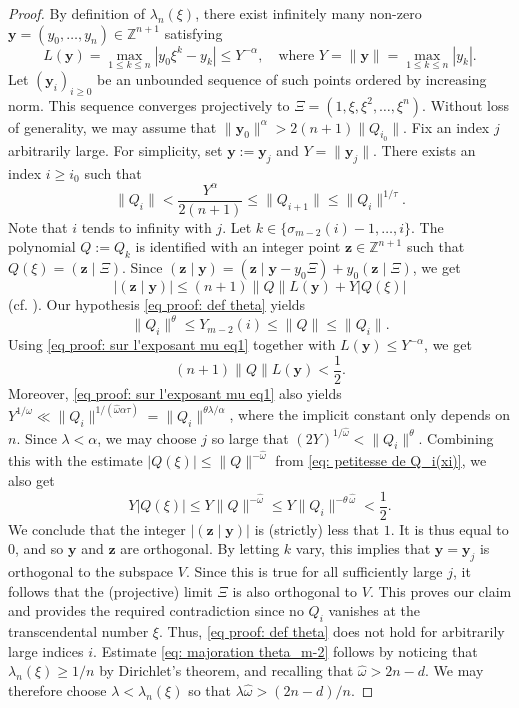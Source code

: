 \documentclass[JEP,XML,SOM,Unicode,NoFloatCountersInSection,published]{cedram}
\newcommand\by{\boldsymbol{y}}
\newcommand\bz{\boldsymbol{z}}
\newcommand\bZ{\mathbb{Z}}
\newcommand\homega{\widehat{\omega}}\newcommand\HH{\mathcal{H}}
\newcommand{\normH}[1]{\|#1\|}
\newcommand{\psc}[2]{\left(#1 \mid #2\right)}
\theoremstyle{definition}
\theoremstyle{plain}
\begin{document}
\begin{proof}
By definition of $\lambda_n(\xi)$, there exist infinitely many non-zero $\by=(y_0,\dots,y_n)\in\bZ^{n+1}$ satisfying
\begin{equation*}
L(\by) =\max_{1\le k \le n} |y_0\xi^k - y_k| \leq Y^{-\alpha},\quad \textrm{where } Y = \normH{\by} = \max_{1\leq k\leq n} |y_k|.
\end{equation*}
Let $(\by_i)_{i\geq 0}$ be an unbounded sequence of such points ordered by increasing norm. This sequence converges projectively to $\Xi = (1,\xi,\xi^2,\dots,\xi^n)$. Without loss of generality, we may assume that $\normH{\by_0}^{\alpha} > 2(n+1)\normH{Q_{i_0}}$. Fix an index $j$ arbitrarily large. For simplicity, set $\by:= \by_j$ and $Y = \normH{\by_j}$. There exists an index $i\geq i_0$ such that
\begin{equation}
\label{eq proof: sur l'exposant mu eq1}
\normH{Q_i} < \frac{Y^{\alpha}}{2(n+1)} \leq \normH{Q_{i+1}} \leq \normH{Q_i}^{1/\tau}.
\end{equation}
Note that $i$ tends to infinity with $j$. Let $k\in\{\sigma_{m-2}(i)-1,\dots,i\}$. The polynomial $Q:=Q_k$ is identified with an integer point $\bz\in\bZ^{n+1}$ such that $Q(\xi)= \psc{\bz}{\Xi}$. Since $\psc{\bz}{\by} = \psc{\bz}{\by -y_0\Xi} + y_0\psc{\bz}{\Xi}$, we get
\begin{equation*}
|\psc{\bz}{\by}| \leq (n+1)\normH{Q}L(\by) + Y |Q(\xi)|
\end{equation*}
(cf. \cite[Lem.\,5]{laurent2003simultaneous}). Our hypothesis \eqref{eq proof: def theta} yields
\begin{equation*}
\normH{Q_i}^\theta \leq Y_{m-2}(i) \leq \normH{Q} \leq \normH{Q_i}.
\end{equation*}
Using \eqref{eq proof: sur l'exposant mu eq1} together with $L(\by)\leq Y^{-\alpha}$, we get
\begin{equation*}
(n+1)\normH{Q}L(\by) <\frac{1}{2}.
\end{equation*}
Moreover, \eqref{eq proof: sur l'exposant mu eq1} also yields $ Y^{1/\homega} \ll \normH{Q_i}^{1/(\homega\alpha\tau)} = \normH{Q_i}^{\theta \lambda / \alpha}$, where the implicit constant only depends on $n$. Since $\lambda < \alpha$, we may choose $j$ so large that $(2Y)^{1/\homega} < \normH{Q_i}^\theta$. Combining this with the estimate $|Q(\xi)|\leq \normH{Q}^{-\homega}$ from \eqref{eq: petitesse de Q_i(xi)}, we also get
\[
Y|Q(\xi)|\leq Y\normH{Q}^{-\homega} \leq Y\normH{Q_i}^{-\theta\,\homega} < \frac{1}{2}.
\]
We conclude that the integer $|\psc{\bz}{\by}|$ is (strictly) less that $1$. It is thus equal to $0$, and so $\by$ and $\bz$ are orthogonal. By letting $k$ vary, this implies that $\by = \by_j$ is orthogonal to the subspace $V$. Since this is true for all sufficiently large $j$, it follows that the (projective) limit $\Xi$ is also orthogonal to $V$. This proves our claim and provides the required contradiction since no $Q_i$ vanishes at the transcendental number $\xi$. Thus, \eqref{eq proof: def theta} does not hold for arbitrarily large indices $i$. Estimate \eqref{eq: majoration theta_m-2} follows by noticing that $\lambda_n(\xi)\geq 1/n$ by Dirichlet's theorem, and recalling that $\homega > 2n-d$. We may therefore choose $\lambda < \lambda_n(\xi)$ so that $\lambda\homega > (2n-d)/n$.
\end{proof}
\end{document}
